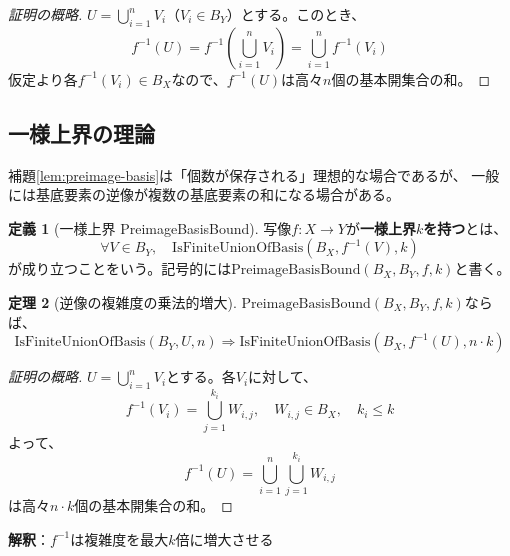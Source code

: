\documentclass[a4paper,12pt]{ltjsarticle}
\theoremstyle{definition}
\newtheorem{definition}{定義}[section]
\newtheorem{theorem}[definition]{定理}
\begin{document}
\begin{proof}[証明の概略]
$U = \bigcup_{i=1}^n V_i$（$V_i \in B_Y$）とする。このとき、
\[
f^{-1}(U) = f^{-1}\left(\bigcup_{i=1}^n V_i\right) = \bigcup_{i=1}^n f^{-1}(V_i)
\]
仮定より各$f^{-1}(V_i) \in B_X$なので、$f^{-1}(U)$は高々$n$個の基本開集合の和。
\end{proof}

\subsection{一様上界の理論}

補題\ref{lem:preimage-basis}は「個数が保存される」理想的な場合であるが、
一般には基底要素の逆像が複数の基底要素の和になる場合がある。

\begin{definition}[一様上界 PreimageBasisBound]
写像$f: X \to Y$が\textbf{一様上界$k$を持つ}とは、
\[
\forall V \in B_Y, \quad \mathrm{IsFiniteUnionOfBasis}(B_X, f^{-1}(V), k)
\]
が成り立つことをいう。記号的には$\mathrm{PreimageBasisBound}(B_X, B_Y, f, k)$と書く。
\end{definition}

\begin{theorem}[逆像の複雑度の乗法的増大]\label{thm:preimage-mul}
$\mathrm{PreimageBasisBound}(B_X, B_Y, f, k)$ならば、
\[
\mathrm{IsFiniteUnionOfBasis}(B_Y, U, n) \Rightarrow \mathrm{IsFiniteUnionOfBasis}(B_X, f^{-1}(U), n \cdot k)
\]
\end{theorem}

\begin{proof}[証明の概略]
$U = \bigcup_{i=1}^n V_i$とする。各$V_i$に対して、
\[
f^{-1}(V_i) = \bigcup_{j=1}^{k_i} W_{i,j}, \quad W_{i,j} \in B_X, \quad k_i \leq k
\]
よって、
\[
f^{-1}(U) = \bigcup_{i=1}^n \bigcup_{j=1}^{k_i} W_{i,j}
\]
は高々$n \cdot k$個の基本開集合の和。
\end{proof}

\begin{mainbox}[title=複雑度の増大の図式]
\begin{center}
\end{center}
\textbf{解釈}：$f^{-1}$は複雑度を最大$k$倍に増大させる
\end{mainbox}
\end{document}
